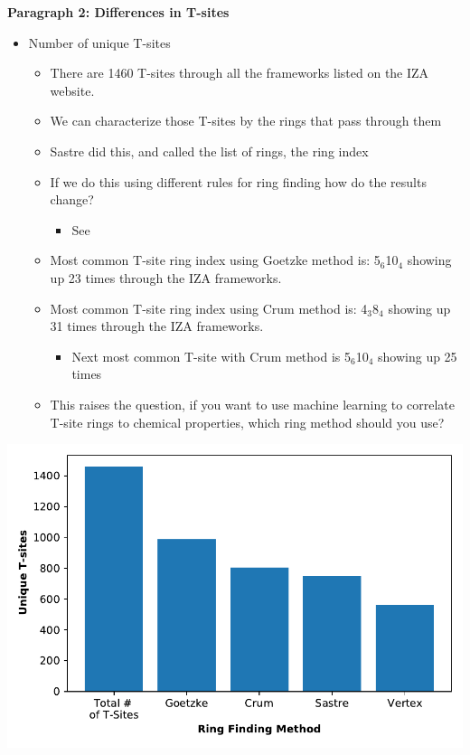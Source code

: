 \documentclass[11pt]{article}
\begin{document}
\textbf{\textbf{Paragraph 2: Differences in T-sites}}
\begin{itemize}
\item Number of unique T-sites
\begin{itemize}
\item There are 1460 T-sites through all the frameworks listed on the IZA website.
\item We can characterize those T-sites by the rings that pass through them
\item Sastre did this, and called the list of rings, the ring index
\item If we do this using different rules for ring finding how do the results change?
\begin{itemize}
\item See 
\end{itemize}
\item Most common T-site ring index using Goetzke method is: 5\(_{\text{6}}\)\textbullet{}10\(_{\text{4}}\) showing up 23 times through the IZA frameworks.
\item Most common T-site ring index using Crum method is: 4\(_{\text{3}}\)\textbullet{}8\(_{\text{4}}\) showing up 31 times through the IZA frameworks.
\begin{itemize}
\item Next most common T-site with Crum method is 5\(_{\text{6}}\)\textbullet{}10\(_{\text{4}}\) showing up 25 times
\end{itemize}
\item This raises the question, if you want to use machine learning to correlate T-site rings to chemical properties, which ring method should you use?
\end{itemize}
\end{itemize}
\begin{center}
\includegraphics[width=.6\textwidth]{../figures/completed-figures/unique-ts.pdf}
\end{center}
\end{document}
